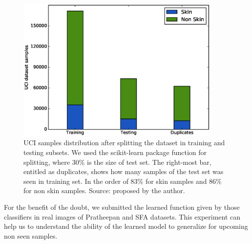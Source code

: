 \begin{figure}[H]
    \centering
    \includegraphics[width=0.9\textwidth]{figuras/uci_split_representation}

    \caption[UCI samples distribution after splitting the dataset in training and testing subsets]{UCI samples distribution after splitting the dataset in training and testing subsets. We used the scikit-learn package function for splitting, where 30\% is the size of test set. The right-most bar, entitled as duplicates, shows how many samples of the test set was seen in training set. In the order of 83\% for skin samples and 86\% for non skin samples. Source: proposed by the author.}
    \label{fig:uci_split_representation}
\end{figure}

For the benefit of the doubt, we submitted the learned function given by those classifiers in real images of Pratheepan and SFA datasets. This experiment can help us to understand the ability of the learned model to generalize for upcoming non seen samples.

